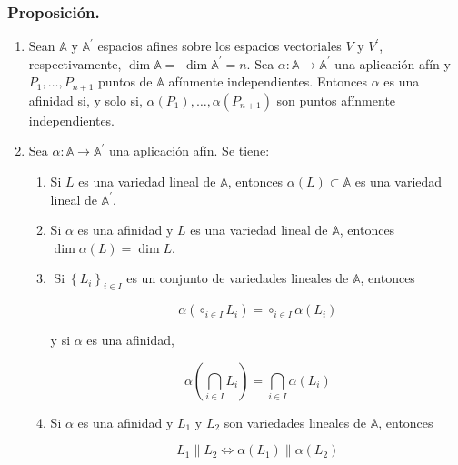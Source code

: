 \documentclass[12pt, a4paper, ones, notitlepage, openany,titlepage]{article}
\begin{document}
\subsubsection{Proposición.}
\begin{enumerate}
	\item Sean $\mathbb{A}$ y $\mathbb{A}^{\prime}$ espacios afines sobre los espacios vectoriales $V$ y $V^{\prime}$, respectivamente, $\dim  \mathbb{A}=$ $\dim  \mathbb{A}^{\prime}=n$. Sea $\alpha: \mathbb{A} \rightarrow \mathbb{A}^{\prime}$ una aplicación afín y $P_{1}, \ldots, P_{n+1}$ puntos de $\mathbb{A}$ afínmente independientes. Entonces $\alpha$ es una afinidad si, y solo si, $\alpha\left(P_{1}\right), \ldots, \alpha\left(P_{n+1}\right)$ son puntos afínmente independientes.
	
	\item Sea $\alpha: \mathbb{A} \rightarrow \mathbb{A}^{\prime}$ una aplicación afín. Se tiene:
	\begin{enumerate}
		\item Si $L$ es una variedad lineal de $\mathbb{A}$, entonces $\alpha(L)\subset\mathbb{A}$ es una variedad lineal de $\mathbb{A}^{\prime}$.
		
		\item Si $\alpha$ es una afinidad y $L$ es una variedad lineal de $\mathbb{A}$, entonces $\dim  \alpha(L)=\dim  L$.
		
		\item $\operatorname{Si}\left\{L_{i}\right\}_{i \in I}$ es un conjunto de variedades lineales de $\mathbb{A}$, entonces
		
		$$
		\alpha\left(\circ_{i \in I} L_{i}\right)=\circ_{i \in I} \alpha\left(L_{i}\right)
		$$
		
		y si $\alpha$ es una afinidad,
		
		$$
		\alpha\left(\bigcap_{i \in I} L_{i}\right)=\bigcap_{i \in I} \alpha\left(L_{i}\right)
		$$
		
		\item Si $\alpha$ es una afinidad y $L_{1}$ y $L_{2}$ son variedades lineales de $\mathbb{A}$, entonces
		
		$$
		L_{1}\left\|L_{2} \Longleftrightarrow \alpha\left(L_{1}\right)\right\| \alpha\left(L_{2}\right)
		$$
	\end{enumerate}
\end{enumerate}
\end{document}
